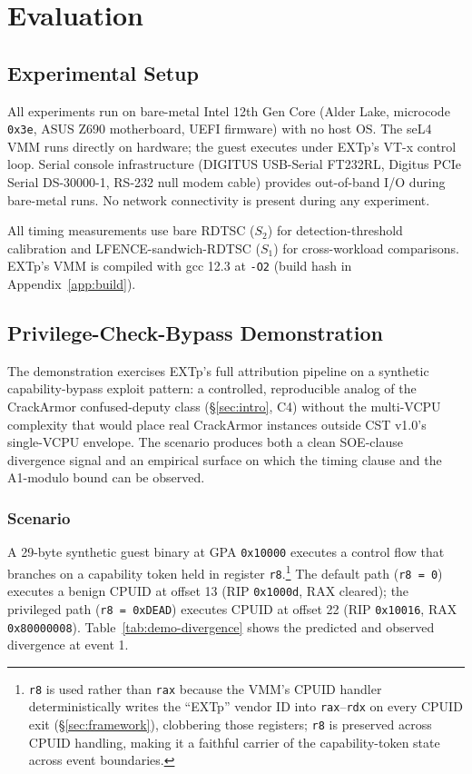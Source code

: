 \documentclass[conference]{IEEEtran}
\begin{document}
\section{Evaluation}\label{sec:eval}

\subsection{Experimental Setup}

All experiments run on bare-metal Intel 12th Gen Core (Alder Lake,
microcode \texttt{0x3e}, ASUS Z690 motherboard, UEFI firmware) with
no host OS. The seL4 VMM runs directly on hardware; the guest
executes under EXTp's VT-x control loop. Serial console infrastructure
(DIGITUS USB-Serial FT232RL, Digitus PCIe Serial DS-30000-1, RS-232
null modem cable) provides out-of-band I/O during bare-metal runs.
No network connectivity is present during any experiment.

All timing measurements use bare RDTSC ($S_2$) for
detection-threshold calibration and LFENCE-sandwich-RDTSC ($S_1$)
for cross-workload comparisons. EXTp's VMM is compiled with gcc 12.3
at \texttt{-O2} (build hash in Appendix~\ref{app:build}).

\subsection{Privilege-Check-Bypass Demonstration}\label{sec:eval-demo}

The demonstration exercises EXTp's full attribution pipeline on a
synthetic capability-bypass exploit pattern: a controlled,
reproducible analog of the CrackArmor confused-deputy class
(\S\ref{sec:intro}, C4) without the multi-VCPU complexity that would
place real CrackArmor instances outside CST v1.0's single-VCPU
envelope. The scenario produces both a clean SOE-clause divergence
signal and an empirical surface on which the timing clause and the
A1-modulo bound can be observed.

\subsubsection{Scenario}

A 29-byte synthetic guest binary at GPA \texttt{0x10000} executes a
control flow that branches on a capability token held in register
\texttt{r8}.\footnote{\texttt{r8} is used rather than \texttt{rax}
because the VMM's CPUID handler deterministically writes the
``EXTp'' vendor ID into \texttt{rax}--\texttt{rdx} on every CPUID
exit (\S\ref{sec:framework}), clobbering those registers; \texttt{r8}
is preserved across CPUID handling, making it a faithful carrier of
the capability-token state across event boundaries.} The default
path (\texttt{r8 = 0}) executes a benign CPUID at offset 13
(RIP \texttt{0x1000d}, RAX cleared); the privileged path
(\texttt{r8 = 0xDEAD}) executes CPUID at offset 22
(RIP \texttt{0x10016}, RAX \texttt{0x80000008}).
Table~\ref{tab:demo-divergence} shows the predicted and observed
divergence at event 1.
\end{document}

